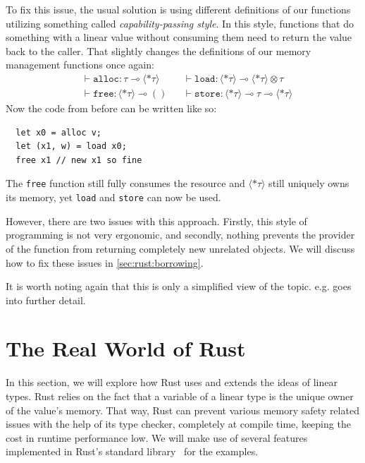\documentclass[sigplan,11pt,screen,nonacm]{acmart}
\begin{document}
To fix this issue, the usual solution is using different definitions of our functions utilizing something called \emph{capability-passing style}. In this style, functions that do something with a linear value without consuming them need to return the value back to the caller. That slightly changes the definitions of our memory management functions once again:
\begin{align*}
  &\vdash \texttt{alloc} : \tau \multimap \langle *\tau\rangle &
  &\vdash \texttt{load} : \langle *\tau\rangle \multimap \langle *\tau\rangle \otimes \tau \\
  &\vdash \texttt{free} : \langle *\tau\rangle \multimap () &
  &\vdash \texttt{store} : \langle *\tau\rangle \multimap \tau \multimap \langle *\tau\rangle
\end{align*}
Now the code from before can be written like so:
\begin{verbatim}
  let x0 = alloc v;
  let (x1, w) = load x0;
  free x1 // new x1 so fine
\end{verbatim}

The \texttt{free} function still fully consumes the resource and \(\langle *\tau\rangle\) still uniquely owns its memory, yet \texttt{load} and \texttt{store} can now be used.

However, there are two issues with this approach. Firstly, this style of programming is not very ergonomic, and secondly, nothing prevents the provider of the function from returning completely new unrelated objects. We will discuss how to fix these issues in \cref{sec:rust:borrowing}.

It is worth noting again that this is only a simplified view of the topic. \citet{wadler-linear-taste} e.g. goes into further detail.

\section{The Real World of Rust} \label{sec:rust}

In this section, we will explore how Rust uses and extends the ideas of linear types. Rust relies on the fact that a variable of a linear type is the unique owner of the value's memory. That way, Rust can prevent various memory safety related issues with the help of its type checker, completely at compile time, keeping the cost in runtime performance low. We will make use of several features implemented in Rust's standard library~\cite{rust:std} for the examples.
\end{document}
